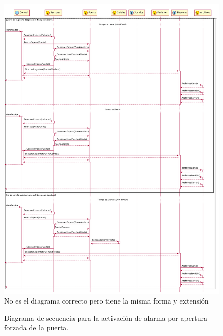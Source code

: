 \begin{figure}[ht]
	\centering
	\includegraphics[width=\textwidth]{Figures/PNK-DS002-B.pdf}
	{\color{red} No es el diagrama correcto pero tiene la misma forma y extensión}
	\caption[Alarma por apertura forzada de la puerta]{Diagrama de secuencia para la activación de alarma por apertura forzada de la puerta.}
	\label{fig:SecuenciaForzada}
\end{figure}

